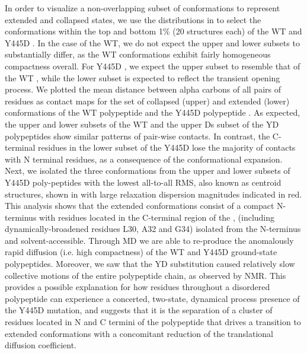 In order to visualize a non-overlapping subset of conformations to represent extended and collapsed states, we use the \diffusion distributions in  to select the conformations within the top and bottom 1\% (20 structures each) of the WT \gct and Y445D \gct. In the case of the WT, we do not expect the upper and lower \diffusion subsets to substantially differ, as the WT \gct conformations exhibit fairly homogeneous compactness overall. For Y445D \gct, we expect the upper \diffusion subset to resemble that of the WT \gct, while the lower \diffusion subset is expected to reflect the transient opening process. We plotted the mean distance between alpha carbons of all pairs of residues as contact maps for the set of collapsed (upper) and extended (lower) conformations of the WT \gct polypeptide  and the Y445D \gct polypeptide .   As expected, the upper and lower \diffusion subsets of the WT \gct and the upper Ds subset of the YD \gct polypeptides show similar patterns of pair-wise contacts.  In contrast, the C-terminal residues in the lower \diffusion subset of the Y445D \gct lose the majority of contacts with N terminal residues, as a consequence of the conformational expansion. Next, we isolated the three conformations from the upper and lower \diffusion subsets of  Y445D \gct poly-peptides with the lowest all-to-all RMS, also known as centroid structures, shown in  with large relaxation dispersion magnitudes indicated in red. This analysis shows that the extended conformations consist of a compact N-terminus with residues located in the C-terminal region of the \gct, (including dynamically-broadened residues L30, A32 and G34) isolated from the N-terminus and solvent-accessible. Through MD we are able to re-produce the anomalously rapid diffusion (i.e. high compactness) of the WT and Y445D ground-state \gct polypeptides. Moreover, we saw that the YD substitution caused relatively slow collective motions of the entire polypeptide chain, as observed by NMR. This provides a possible explanation for how residues throughout a disordered polypeptide can experience a concerted, two-state, dynamical process presence of the Y445D mutation, and suggests that it is the separation of a cluster of residues located in N and C termini of the \gct polypeptide that drives a transition to extended conformations with a concomitant  reduction of the translational diffusion coefficient.


\begin{figure}
\centering     %
{}
\label{fig:contacts}
\end{figure}




